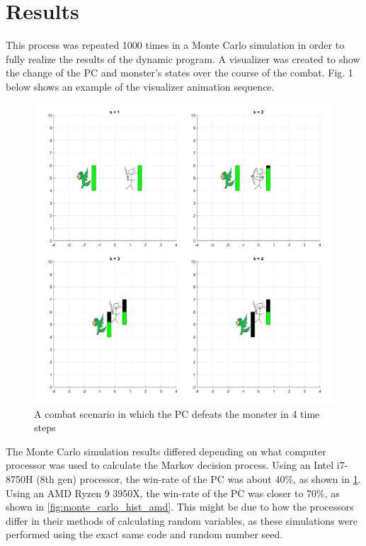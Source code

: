 \documentclass[letterpaper, 10 pt, conference]{ieeeconf}
\begin{document}
\section{Results}
This process was repeated 1000 times in a Monte Carlo simulation in order to fully realize the results of the 
dynamic program. A visualizer was created to show the change of the PC and monster's states over the course of the 
combat. Fig. 1 below shows an example of the visualizer animation sequence.

\pagebreak

\begin{figure}[h]
\centering
\includegraphics[scale = 0.2]{figs/DND_SingleSim_Animation_rng_seed=1997.png}
\caption{A combat scenario in which the PC defeats the monster in 4 time steps}
\label{fig:single_sim_animation_1997}
\end{figure}

The Monte Carlo simulation results differed depending on what computer processor was used to calculate the Markov decision 
process. Using an Intel i7-8750H (8th gen) processor, the win-rate of the PC was about 40\%, as shown in \cref{fig:single_sim_animation_1997}. 
Using an AMD Ryzen 9 3950X, the win-rate of the PC was closer to 70\%, as shown in \cref{fig:monte_carlo_hist_amd}. 
This might be due to how the processors differ in their methods of calculating random variables, as these simulations were performed using the exact same code and random number seed.
\end{document}
